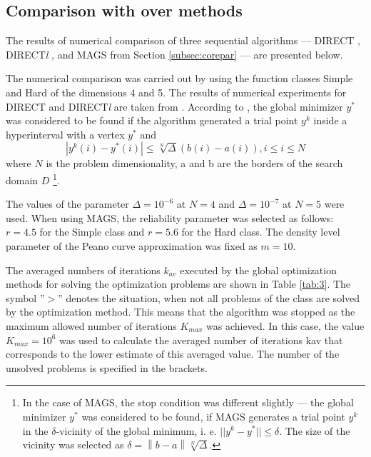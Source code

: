 \documentclass{aims}
\theoremstyle{definition}
\begin{document}
\subsection{Comparison with over methods}
The results of numerical comparison of three sequential algorithms --- DIRECT
\cite{Jones}, DIRECT\textit{l} \cite{Gablonsky}, and MAGS from Section \ref{subsec:corepar} --- are presented below.

The numerical comparison was carried out by using the function classes Simple and Hard
of the dimensions 4 and 5. The results of numerical experiments for DIRECT and
DIRECT\textit{l} are taken from \cite{sergeyevKvasov2006}. According to \cite{sergeyevKvasov2006}, the global minimizer \(y^*\)
was considered to be found if the algorithm generated a trial point \(y^k\) inside
a hyperinterval with a vertex \(y^*\) and
\begin{displaymath}
    |y^k(i)-y^*(i)|\le \sqrt[N]{\Delta}(b(i)-a(i)), i\le i\le N
\end{displaymath}
where \(N\) is the problem dimensionality, a and b are the borders of the search domain \(D\)
\footnote{In the case of MAGS, the stop condition was different slightly --- the
global minimizer \(y^*\) was considered to be found, if MAGS generates a trial
point \(y^k\)  in the \(\delta\)-vicinity of the global minimum, i. e. \(||y^k-y^*||\le\delta\).
The size of the vicinity was selected  as \(\delta=\left\|b-a\right\|\sqrt[N]{\Delta}\).}.

The values of the parameter \(\Delta = 10^{-6}\) at \(N = 4\) and \(\Delta = 10^{-7}\)
at \(N = 5\) were used. When using MAGS, the reliability parameter was selected as
follows: \(r = 4.5\) for the Simple class and \(r = 5.6\) for the Hard class.
The density level parameter of the Peano curve approximation was fixed as \(m = 10\).

The averaged numbers of iterations $k_{av}$ executed by the global optimization methods
for solving the optimization problems are shown in Table \ref{tab:3}. The symbol ''$>$''
denotes the situation, when not all problems of the class are solved by the optimization
method. This means that the algorithm was stopped as the maximum allowed number of
iterations $K_{max}$ was achieved. In this case, the value $K_{max}= 10^6$  was used to
calculate the averaged number of iterations kav that corresponds to the lower estimate
of this averaged value. The number of the unsolved problems is specified in the brackets.
\end{document}
